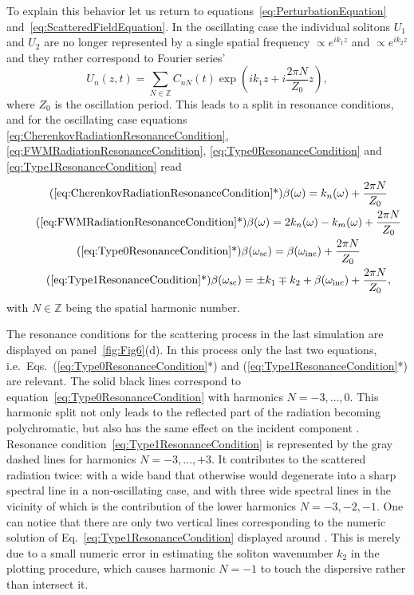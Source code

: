 \documentclass[aps, pra, twocolumn, superscriptaddress, final]{revtex4}
\newcommand*\circled[1]{
  \tikz[baseline=(char.base)]{
    \node[shape=circle,draw,inner sep=0.5pt] (char) {#1};
  }
}
\begin{document}
To explain this behavior let us return to
equations~\eqref{eq:PerturbationEquation}
and~\eqref{eq:ScatteredFieldEquation}. In the oscillating case the individual
solitons $U_{1}$ and $U_{2}$ are no longer represented by a single spatial
frequency $\propto e^{i k_{1} z}$ and $\propto e^{i k_{2} z}$ and they rather
correspond to Fourier series'
\begin{equation*}
  U_{n}(z, t) =
    \sum \limits_{N \in \mathbb{Z}}
    C_{nN}(t) \exp \left(
      i k_{1} z + i \frac{2 \pi N}{Z_{0}} z
    \right),
\end{equation*}
where $Z_{0}$ is the oscillation period. This leads to a split in resonance conditions, and for the oscillating case equations \eqref{eq:CherenkovRadiationResonanceCondition}, \eqref{eq:FWMRadiationResonanceCondition}, \eqref{eq:Type0ResonanceCondition} and \eqref{eq:Type1ResonanceCondition} read
\begin{gather}
  \label{eq:CherenkovRadiationresonanceConditionZ0}
  \tag{\ref{eq:CherenkovRadiationResonanceCondition}*}
  \beta(\omega) = k_{n}(\omega) + \frac{2 \pi N}{Z_{0}} \\
  \label{eq:FWMradiationResonanceConditionZ0}
  \tag{\ref{eq:FWMRadiationResonanceCondition}*}
  \beta(\omega) =
    2 k_{n}(\omega)  - k_{m}(\omega) +
    \frac{2 \pi N}{Z_{0}} \\
  \label{eq:Type0ResonanceConditionZ0}
  \tag{\ref{eq:Type0ResonanceCondition}*}
  \beta(\omega_{\text{sc}}) =
    \beta(\omega_{\text{inc}}) +
    \frac{2 \pi N}{Z_{0}} \\
  \label{eq:Type1ResonanceConditionZ0}
  \tag{\ref{eq:Type1ResonanceCondition}*}
  \beta(\omega_{\text{sc}}) =
    \pm k_{1} \mp k_{2} +
    \beta(\omega_{\text{inc}}) +
    \frac{2 \pi N}{Z_{0}},
\end{gather}
with $N \in \mathbb{Z}$ being the spatial harmonic number.

The resonance conditions for the scattering process in the last simulation are
displayed on panel~\ref{fig:Fig6}(d). In this process only the last two
equations, i.e.\
Eqs.~(\ref{eq:Type0ResonanceCondition}*) and (\ref{eq:Type1ResonanceCondition}*) are
relevant. The solid black lines correspond to
equation~\eqref{eq:Type0ResonanceCondition} with harmonics $N =
-3, \dots, 0$. This harmonic split not only leads to the reflected part of the
radiation \circled{1} becoming polychromatic, but also has the same effect on
the incident component \circled{i}. Resonance
condition~\eqref{eq:Type1ResonanceCondition} is represented by the gray dashed
lines for harmonics $N = -3, \dots, +3$. It contributes to the scattered
radiation twice: with a wide band \circled{2} that otherwise would degenerate
into a sharp spectral line in a non-oscillating case, and with three wide
spectral lines in the vicinity of \circled{3} which is the contribution of the
lower harmonics $N = -3, -2, -1$. One can notice that there are only two
vertical lines corresponding to the numeric solution
of Eq.~\eqref{eq:Type1ResonanceCondition} displayed around \circled{3}. This is
merely due to a small numeric error in estimating the soliton wavenumber
$k_{2}$ in the plotting procedure, which causes harmonic $N=-1$ to touch the
dispersive rather than intersect it.
\end{document}

